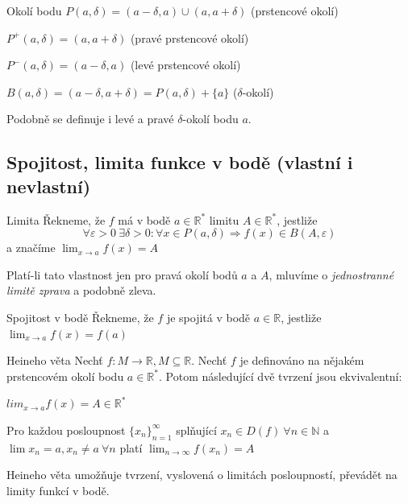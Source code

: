 \begin{definiceN}{Okolí bodu}
$P(a, \delta) = (a-\delta, a) \cup (a, a+\delta)$ (prstencové okolí)

\noindent
$P^{+}(a, \delta)=(a, a+\delta)$ (pravé prstencové okolí)

\noindent
$P^{-}(a, \delta)=(a-\delta, a)$ (levé prstencové okolí)

\noindent
$B(a, \delta)=(a-\delta, a+\delta) = P(a, \delta)+\{a\}$ ($\delta$-okolí)

\noindent
Podobně se definuje i levé a pravé $\delta$-okolí bodu $a$.
\end{definiceN}

\subsection{Spojitost, limita funkce v bodě (vlastní i nevlastní)}

\begin{definiceN}{Limita}
Řekneme, že $f$ má v bodě $a \in \mathbb{R}^{*}$ limitu $A \in \mathbb{R^{*}}$, jestliže
$$\forall \varepsilon>0\ \exists \delta>0: \forall x \in P(a, \delta) \Rightarrow f(x) \in B(A, \varepsilon)$$
a značíme $\lim_{x \rightarrow a} f(x) = A$

\medskip
Platí-li tato vlastnost jen pro pravá okolí bodů $a$ a $A$, mluvíme o \emph{jednostranné limitě zprava} a podobně zleva.
\end{definiceN}

\begin{definiceN}{Spojitost v bodě}
Řekneme, že $f$ je spojitá v bodě $a \in \mathbb{R}$, jestliže $\lim_{x \rightarrow a} f(x) = f(a)$
\end{definiceN}

\begin{vetaN}{Heineho věta}
Nechť  $f: M \rightarrow \mathbb{R}, M \subseteq \mathbb{R}$. Nechť $f$ je definováno na nějakém prstencovém okolí bodu $a \in \mathbb{R}^{*}$. Potom následující dvě tvrzení jsou ekvivalentní:
\begin{penumerate}
	\item $lim_{x \rightarrow a} f(x) = A \in \mathbb{R}^{*}$
	\item Pro každou posloupnost $\{x_n\}_{n=1}^{\infty}$ splňující $x_n \in D(f)\ \forall n \in \mathbb{N}$ a  $\lim x_n = a, x_n \neq a\ \forall n$ platí $\lim_{n \rightarrow \infty} f(x_n)=A$
\end{penumerate}
Heineho věta umožňuje tvrzení, vyslovená o limitách posloupností, převádět na limity funkcí v bodě.
\end{vetaN}

